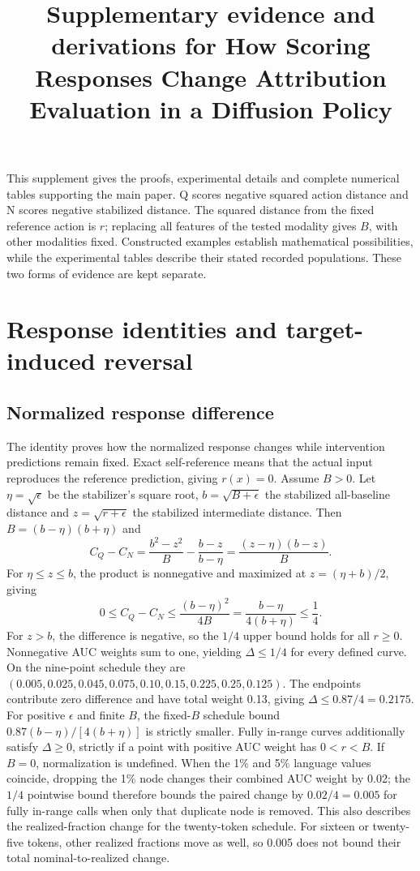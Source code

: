 \documentclass[12pt,letterpaper]{article}
\title{Supplementary evidence and derivations for How Scoring Responses Change Attribution Evaluation in a Diffusion Policy}
\author{}
\date{}
\begin{document}
\maketitle
This supplement gives the proofs, experimental details and complete numerical tables supporting the main paper. Q scores negative squared action distance and N scores negative stabilized distance. The squared distance from the fixed reference action is $r$; replacing all features of the tested modality gives $B$, with other modalities fixed. Constructed examples establish mathematical possibilities, while the experimental tables describe their stated recorded populations. These two forms of evidence are kept separate.
\appendix
\section{Response identities and target-induced reversal}
\label{sec:proofs}

\subsection{Normalized response difference}
\label{sec:response-proof}

The identity proves how the normalized response changes while intervention predictions remain fixed. Exact self-reference means that the actual input reproduces the reference prediction, giving $r(x)=0$. Assume $B>0$. Let $\eta=\sqrt{\epsilon}$ be the stabilizer's square root, $b=\sqrt{B+\epsilon}$ the stabilized all-baseline distance and $z=\sqrt{r+\epsilon}$ the stabilized intermediate distance. Then $B=(b-\eta)(b+\eta)$ and
\begin{equation}
C_Q-C_N=\frac{b^2-z^2}{B}-\frac{b-z}{b-\eta}
=\frac{(z-\eta)(b-z)}{B}.
\end{equation}
For $\eta\le z\le b$, the product is nonnegative and maximized at $z=(\eta+b)/2$, giving
\begin{equation}
0\le C_Q-C_N\le\frac{(b-\eta)^2}{4B}
=\frac{b-\eta}{4(b+\eta)}\le\frac14.
\end{equation}
For $z>b$, the difference is negative, so the $1/4$ upper bound holds for all $r\ge0$. Nonnegative AUC weights sum to one, yielding $\Delta\le1/4$ for every defined curve. On the nine-point schedule they are $(0.005,0.025,0.045,0.075,0.10,0.15,0.225,0.25,0.125)$. The endpoints contribute zero difference and have total weight 0.13, giving $\Delta\le0.87/4=0.2175$. For positive $\epsilon$ and finite $B$, the fixed-$B$ schedule bound $0.87(b-\eta)/[4(b+\eta)]$ is strictly smaller. Fully in-range curves additionally satisfy $\Delta\ge0$, strictly if a point with positive AUC weight has $0<r<B$. If $B=0$, normalization is undefined. When the 1\% and 5\% language values coincide, dropping the 1\% node changes their combined AUC weight by 0.02; the $1/4$ pointwise bound therefore bounds the paired change by $0.02/4=0.005$ for fully in-range calls when only that duplicate node is removed. This also describes the realized-fraction change for the twenty-token schedule. For sixteen or twenty-five tokens, other realized fractions move as well, so 0.005 does not bound their total nominal-to-realized change.
\end{document}
